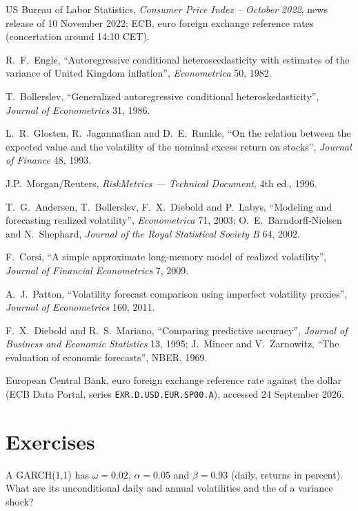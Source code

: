 \begin{omsources}
\item US Bureau of Labor Statistics, \emph{Consumer Price Index -- October 2022}, news release of 10 November 2022; ECB, euro foreign exchange reference rates (concertation around 14:10 CET).
\item R.~F.~Engle, ``Autoregressive conditional heteroscedasticity with estimates of the variance of United Kingdom inflation'', \emph{Econometrica} 50, 1982.
\item T.~Bollerslev, ``Generalized autoregressive conditional heteroskedasticity'', \emph{Journal of Econometrics} 31, 1986.
\item L.~R.~Glosten, R.~Jagannathan and D.~E.~Runkle, ``On the relation between the expected value and the volatility of the nominal excess return on stocks'',
\emph{Journal of Finance} 48, 1993.
\item J.P.~Morgan/Reuters, \emph{RiskMetrics --- Technical Document}, 4th ed., 1996.
\item T.~G.~Andersen, T.~Bollerslev, F.~X.~Diebold and P.~Labys, ``Modeling and forecasting realized volatility'', \emph{Econometrica} 71, 2003;
O.~E.~Barndorff-Nielsen and N.~Shephard, \emph{Journal of the Royal Statistical Society B} 64, 2002.
\item F.~Corsi, ``A simple approximate long-memory model of realized volatility'', \emph{Journal of Financial Econometrics} 7, 2009.
\item A.~J.~Patton, ``Volatility forecast comparison using imperfect volatility proxies'', \emph{Journal of Econometrics} 160, 2011.
\item F.~X.~Diebold and R.~S.~Mariano, ``Comparing predictive accuracy'', \emph{Journal of Business and Economic Statistics} 13, 1995; J.~Mincer and
V.~Zarnowitz, ``The evaluation of economic forecasts'', NBER, 1969.
\item European Central Bank, euro foreign exchange reference rate against the dollar (ECB Data Portal, series \texttt{EXR.D.USD.EUR.SP00.A}), accessed 24
September 2026.
\end{omsources}

\section{Exercises}

\begin{exercise}[$\star$]\label{exo:qm:volatility-models:1}
A GARCH(1,1) has $\omega = 0.02$, $\alpha = 0.05$ and $\beta = 0.93$ (daily, returns in percent). What are its unconditional daily and annual volatilities and
the  of a variance shock?
\end{exercise}

